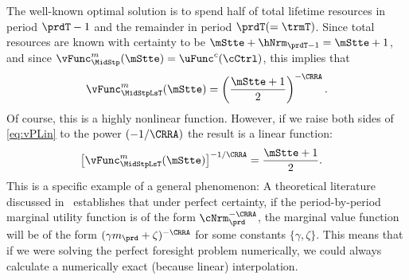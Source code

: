 \documentclass[\econtexRoot/SolvingMicroDSOPs]{subfiles}
\begin{document}
The well-known optimal solution is to spend half of total lifetime resources in period $\prdT-1$ and the remainder in period $\prdT (=\trmT)$.  Since total resources are known with certainty to be $\mStte+\hNrm_{\prdT-1}= \mStte+1$, and since ${\vFunc}_{\MidStp}^{{m}}(\mStte) = \uFunc^{{c}}(\cCtrl)$, this implies that
\begin{equation}
  \vFunc^{{m}}_{\MidStpLsT}(\mStte)  = \left(\frac{\mStte+1}{2}\right)^{-\CRRA} \label{eq:vPLin}.
\end{equation}
Of course, this is a highly nonlinear function.  However, if we raise both sides of \eqref{eq:vPLin} to the power $(-1/\CRRA)$ the result is a linear function:
\begin{equation}\begin{gathered}\begin{aligned}
      \left[\vFunc^{{m}}_{\MidStpLsT}(\mStte)\right]^{-1/\CRRA}  & = \frac{\mStte+1}{2}  .
    \end{aligned}\end{gathered}\end{equation}
This is a specific example of a general phenomenon: A theoretical literature discussed in~\cite{ckConcavity} establishes that under perfect certainty, if the period-by-period marginal utility function is of the form $\cNrm_{\prd}^{-\CRRA}$, the marginal value function will be of the form $(\gamma {m}_{\prd}+\zeta)^{-\CRRA}$ for some constants $\{\gamma,\zeta\}$.  This means that if we were solving the perfect foresight problem numerically, we could always calculate a numerically exact (because linear) interpolation.
\end{document}

